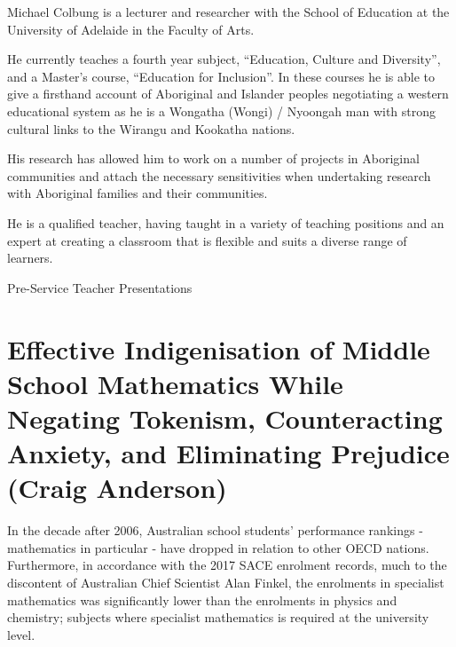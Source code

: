 \documentclass[twoside,12pt,a4paper,notitlepage]{memoir}
\begin{document}
Michael Colbung is a lecturer and researcher with the School of Education at the University of Adelaide in the Faculty of Arts. 

He currently teaches a fourth year subject, “Education, Culture and Diversity”, and a Master’s course, “Education for Inclusion”. In these courses he is able to give a firsthand account of Aboriginal and Islander peoples negotiating a western educational system as he is a Wongatha (Wongi) / Nyoongah man with strong cultural links to the Wirangu and Kookatha nations.

His research has allowed him to work on a number of projects in Aboriginal communities and attach the necessary sensitivities when undertaking research with Aboriginal families and their communities.

He is a qualified teacher, having taught in a variety of teaching positions and an expert at creating a classroom that is flexible and suits a diverse range of learners.
\vfill



\clearpage{}
\vspace*{2cm}
{\Huge Pre-Service Teacher Presentations}
\vspace{2cm}

\section*{Effective Indigenisation of Middle School Mathematics While Negating Tokenism, Counteracting Anxiety, and Eliminating Prejudice (Craig Anderson)}
\label{aut:anderson}

In the decade after 2006, Australian school students’ performance rankings - mathematics in particular - have dropped in relation to other OECD nations. Furthermore, in accordance with the 2017 SACE enrolment records, much to the discontent of Australian Chief Scientist Alan Finkel, the enrolments in specialist mathematics was significantly lower than the enrolments in physics and chemistry; subjects where specialist mathematics is required at the university level.
\end{document}

